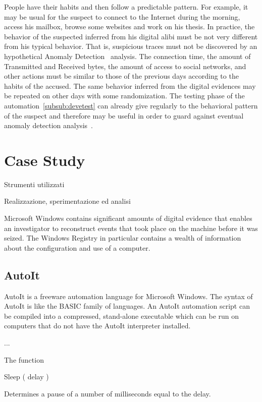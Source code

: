 \documentclass[runningheads,english]{llncs}
\begin{document}
{People have their habits and then follow a predictable pattern. For example, it may be usual for the suspect to connect to the Internet during the morning, access his mailbox, browse some websites and work on his thesis. In practice, the behavior of the suspected inferred from his digital alibi must be not very different from his typical behavior. That is, suspicious traces must not be discovered by an hypothetical Anomaly Detection~\cite{zanero} analysis.
The connection time, the amount of Transmitted and Received bytes, the amount of access to social networks, and other actions must be similar to those of the previous days according to the habits of the accused. The same behavior inferred from the digital evidences may be repeated on other days with some randomization.
The testing phase of the automation~\ref{subsub:devetest} can already give regularly to the behavioral pattern of the suspect and therefore may be useful in order to guard against eventual anomaly detection analysis~\cite{Chandola}.

\section{Case Study}
\label{sec:CaseStudy}

Strumenti utilizzati

Realizzazione, sperimentazione ed analisi

Microsoft Windows contains significant amounts of digital
evidence that enables an investigator to reconstruct
events that took place on the machine before it was
seized. The Windows Registry in particular contains
a wealth of information about the configuration and use
of a computer. \cite{Carrier}

\subsection{AutoIt}

AutoIt is a freeware automation language for Microsoft Windows.
The syntax of AutoIt is like the BASIC family of languages.
An AutoIt automation script can be compiled into a compressed, stand-alone
executable which can be run on computers that do not have the AutoIt interpreter
installed.

...

The function 

Sleep ( delay )

Determines a pause of a number of milliseconds equal to the delay. 


}
\end{document}
